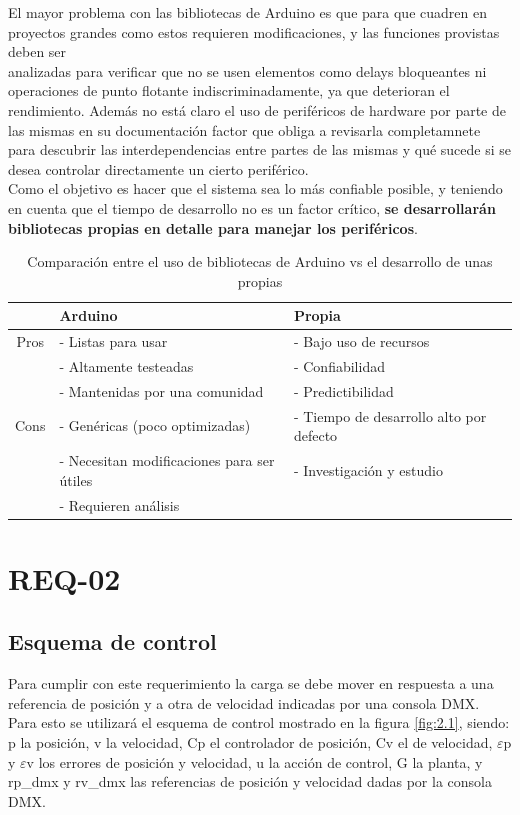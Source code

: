 El mayor problema con las bibliotecas de Arduino es que para que cuadren en proyectos grandes como estos requieren modificaciones, y las funciones provistas deben ser \\analizadas para verificar que no se usen elementos como delays bloqueantes ni operaciones de punto flotante indiscriminadamente, ya que deterioran el rendimiento. Además no está claro el uso de periféricos de hardware por parte de las mismas en su documentación factor que obliga a revisarla completamnete para descubrir las interdependencias entre partes de las mismas y qué sucede si se desea controlar directamente un cierto periférico. \\
Como el objetivo es hacer que el sistema sea lo más confiable posible, y teniendo en cuenta que el tiempo de desarrollo no es un factor crítico, \textbf{se desarrollarán bibliotecas propias en detalle para manejar los periféricos}.\\

\begin{table}[!ht]
	\begin{center}
		\begin{tabular}{|c|l|l|}
			\hline
			\rowcolor{OODlightblue}
			\textbf{} & \textbf{Arduino} & \textbf{Propia} \\
			\hline \hline
			Pros & - Listas para usar & - Bajo uso de recursos \\
			& - Altamente testeadas  & - Confiabilidad \\
			& - Mantenidas por una comunidad & - Predictibilidad \\
			\hline
			Cons & - Genéricas (poco optimizadas) & - Tiempo de desarrollo alto por defecto \\
			& - Necesitan modificaciones para ser útiles & - Investigación y estudio \\
			& - Requieren análisis &   \\
			\hline
		\end{tabular}
	\end{center}
	\caption{Comparación entre el uso de bibliotecas de Arduino vs el desarrollo de unas propias}
	\label{table:\thetable}
\end{table}

\section{REQ-02} \label{sec:\thesection}
\subsection{Esquema de control}
Para cumplir con este requerimiento la carga se debe mover en respuesta a una referencia de posición y a otra de velocidad indicadas por una consola DMX. Para esto se utilizará el esquema de control mostrado en la figura \ref{fig:2.1}, siendo: p la posición, v la velocidad,  Cp el controlador de posición, Cv el de velocidad, \(\varepsilon\)p y \(\varepsilon\)v los errores de posición y velocidad, u la acción de control, G la planta, y rp\_dmx y rv\_dmx las referencias de posición y velocidad dadas por la consola DMX.

